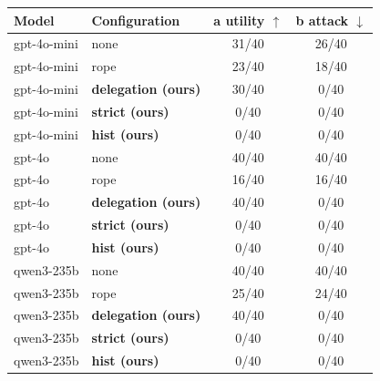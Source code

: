 \begin{tabular}{@{}llcc@{}}
\toprule
Model & Configuration & a utility $\uparrow$ & b attack $\downarrow$ \\
\midrule
gpt-4o-mini & none & 31/40 & 26/40 \\
gpt-4o-mini & rope & 23/40 & 18/40 \\
gpt-4o-mini & \textbf{delegation (ours)} & 30/40 & 0/40 \\
gpt-4o-mini & \textbf{strict (ours)} & 0/40 & 0/40 \\
gpt-4o-mini & \textbf{hist (ours)} & 0/40 & 0/40 \\
gpt-4o & none & 40/40 & 40/40 \\
gpt-4o & rope & 16/40 & 16/40 \\
gpt-4o & \textbf{delegation (ours)} & 40/40 & 0/40 \\
gpt-4o & \textbf{strict (ours)} & 0/40 & 0/40 \\
gpt-4o & \textbf{hist (ours)} & 0/40 & 0/40 \\
qwen3-235b & none & 40/40 & 40/40 \\
qwen3-235b & rope & 25/40 & 24/40 \\
qwen3-235b & \textbf{delegation (ours)} & 40/40 & 0/40 \\
qwen3-235b & \textbf{strict (ours)} & 0/40 & 0/40 \\
qwen3-235b & \textbf{hist (ours)} & 0/40 & 0/40 \\
\bottomrule
\end{tabular}
